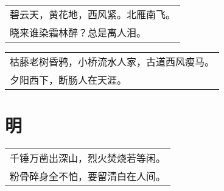 \nopagebreak%
\nopagebreak%
\noindent\begin{minipage}{\linewidth}
  \vskip-3pt\begin{table}[H]
    \centering
    \begin{tabular}{@{}l@{}}
碧云天，黄花地，西风紧。北雁南飞。\\
晓来谁染霜林醉？总是离人泪。
    \end{tabular}
  \end{table}
\end{minipage}
\vspace{1cm}


\nopagebreak%
\nopagebreak%
\noindent\begin{minipage}{\linewidth}
  \vskip-3pt\begin{table}[H]
    \centering
    \begin{tabular}{@{}l@{}}
枯藤老树昏鸦，小桥流水人家，古道西风瘦马。\\
夕阳西下，断肠人在天涯。
    \end{tabular}
  \end{table}
\end{minipage}
\vspace{1cm}


\chapter{明}
\nopagebreak%
\nopagebreak%
\noindent\begin{minipage}{\linewidth}
  \vskip-3pt\begin{table}[H]
    \centering
    \begin{tabular}{@{}l@{}}
千锤万凿出深山，烈火焚烧若等闲。\\
粉骨碎身全不怕，要留清白在人间。
    \end{tabular}
  \end{table}
\end{minipage}
\vspace{1cm}


